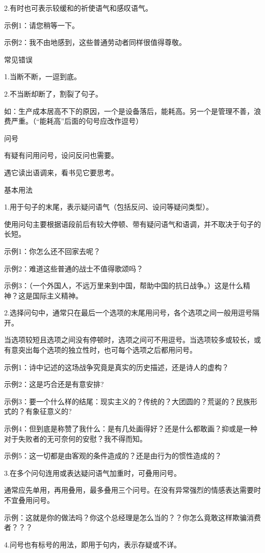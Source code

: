 2.有时也可表示较缓和的祈使语气和感叹语气。

示例1：请您稍等一下。

示例2：我不由地感到，这些普通劳动者同样很值得尊敬。

常见错误

1.当断不断，一逗到底。

2.不当断却断了，割裂了句子。

如：生产成本居高不下的原因，一个是设备落后，能耗高。另一个是管理不善，浪费严重。（“能耗高”后面的句号应改作逗号）

问号

有疑有问用问号，设问反问也需要。

遇它读出语调来，看书见它要思考。

基本用法

1.用于句子的末尾，表示疑问语气（包括反问、设问等疑问类型）。

使用问句主要根据语段前后有较大停顿、带有疑问语气和语调，并不取决于句子的长短。

示例1：你怎么还不回家去呢？

示例2：难道这些普通的战士不值得歌颂吗？

示例3：（一个外国人，不远万里来到中国，帮助中国的抗日战争。）这是什么精神？这是国际主义精神。

2.选择问句中，通常只在最后一个选项的末尾用问号，各个选项之间一般用逗号隔开。

当选项较短且选项之间没有停顿时，选项之间可不用逗号。当选项较多或较长，或有意突出每个选项的独立性时，也可每个选项之后都用问号。

示例1：诗中记述的这场战争究竟是真实的历史描述，还是诗人的虚构？

示例2：这是巧合还是有意安排?

示例3：要一个什么样的结尾：现实主义的？传统的？大团圆的？荒诞的？民族形式的？有象征意义的?

示例4：但到底是称赞了我什么：是有几处画得好？还是什么都敢画？抑或是一种对于失败者的无可奈何的安慰？我不得而知。

示例5：这一切都是由客观的条件造成的？还是由行为的惯性造成的？

3.在多个问句连用或表达疑问语气加重时，可叠用问号。

通常应先单用，再用叠用，最多叠用三个问号。在没有异常强烈的情感表达需要时不宜叠用问号。

示例：这就是你的做法吗？你这个总经理是怎么当的？？你怎么竟敢这样欺骗消费者？？？

4.问号也有标号的用法，即用于句内，表示存疑或不详。

